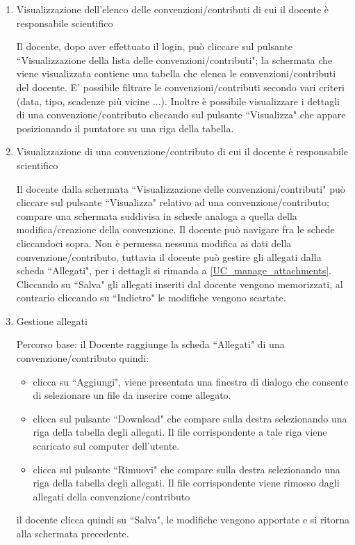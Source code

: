 \begin{enumerate}
\begin{enumerate}
 
 \item Visualizzazione dell'elenco delle convenzioni/contributi di cui il docente è responsabile scientifico\\ \label{UC_view_own_contract_list}
 
 Il docente, dopo aver effettuato il login, può cliccare sul pulsante ``Visualizzazione della lista delle convenzioni/contributi"; la schermata
 che viene visualizzata contiene una tabella che elenca le convenzioni/contributi del docente. E' possibile filtrare le convenzioni/contributi
 secondo vari criteri (data, tipo, scadenze più vicine ...). Inoltre è possibile visualizzare i dettagli di una convenzione/contributo cliccando sul
 pulsante ``Visualizza" che appare posizionando il puntatore su una riga della tabella.
 
 \item Visualizzazione di una convenzione/contributo di cui il docente è responsabile scientifico\\ \label{UC_view_own_contract}
 
 Il docente dalla schermata ``Visualizzazione delle convenzioni/contributi" può cliccare sul pulsante ``Visualizza" relativo ad una convenzione/contributo; compare una schermata suddivisa in schede analoga a quella della modifica/creazione
 della convenzione. Il docente può navigare fra le schede cliccandoci sopra. Non è permessa nessuna modifica ai dati della convenzione/contributo, tuttavia il docente può gestire gli allegati dalla scheda ``Allegati", per i dettagli
 si rimanda a \ref{UC_manage_attachments}. Cliccando su ``Salva"
 gli allegati inseriti dal docente vengono memorizzati, al contrario cliccando su ``Indietro" le modifiche vengono scartate.
 
 \item Gestione allegati\\ \label{UC_manage_attachments}
  
 Percorso base:
 il Docente raggiunge la scheda ``Allegati" di una convenzione/contributo quindi:
  \begin{itemize}
   \item clicca su ``Aggiungi", viene presentata una finestra di dialogo che consente di selezionare un file da inserire come allegato.
   \item clicca sul pulsante ``Download" che compare sulla destra selezionando una riga della tabella degli allegati. Il file corrispondente a tale riga viene scaricato sul computer dell'utente.
   \item clicca sul pulsante ``Rimuovi" che compare sulla destra selezionando una riga della tabella degli allegati. Il file corrispondente viene rimosso dagli allegati della convenzione/contributo
  \end{itemize}
 il docente clicca quindi su ``Salva", le modifiche vengono apportate e si ritorna alla schermata precedente.
 

\end{enumerate}
\end{enumerate}
